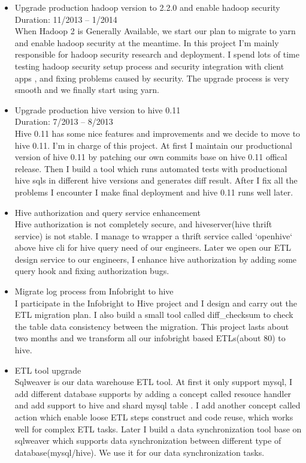 \documentclass[margin,line]{resume}
\begin{document}
\begin{resume}
    \begin{itemize}[leftmargin=3mm]
        \item Upgrade production hadoop version to 2.2.0 and enable hadoop security\\
        Duration: 11/2013 -- 1/2014\\
        When Hadoop 2 is Generally Available, we start our plan to migrate to yarn and enable hadoop  security at the meantime. In this project I'm mainly responsible for hadoop security research and deployment. I spend lots of time testing hadoop security setup process and security integration with client apps , and fixing problems caused by security. The upgrade process is very smooth and we finally start using yarn.
        \item Upgrade production hive version to hive 0.11\\
        Duration: 7/2013 -- 8/2013\\
        Hive 0.11 has some nice features and improvements and we decide to move to hive 0.11. I'm in charge of this project. At first I maintain our productional version of hive 0.11 by patching our own commits base on hive 0.11 offical release. Then I build a tool which runs automated tests with productional hive sqls in different hive versions and generates diff result. After I fix all the problems I encounter I make final deployment and hive 0.11 runs well later.
        \item Hive authorization and query service enhancement\\
        Hive authorization is not completely secure, and hiveserver(hive thrift service) is not stable. I manage to wrapper a thrift service called `openhive` above hive cli for hive query need of our engineers. Later we open our ETL design service to our engineers, I enhance hive authorization by adding some query hook and fixing authorization bugs.
        \item Migrate log process from Infobright to hive\\
        I participate in the Infobright to Hive project and I design and carry out the ETL migration plan. I also build a small tool called diff\_checksum to check the table data consistency between the migration. This project lasts about two months and we transform all our infobright based ETLs(about 80) to hive.
        \item ETL tool upgrade\\
      Sqlweaver is our data warehouse ETL tool. At first it only support mysql, I add different database supports by adding a concept called resouce handler and add support to hive and shard mysql table . I add another concept called action which enable loose ETL steps construct and code reuse, which works well for complex ETL tasks. Later I build a data synchronization tool base on sqlweaver which supports data synchronization between different type of database(mysql/hive). We use it for our data synchronization tasks.
    \end{itemize}


\end{resume}
\end{document}
